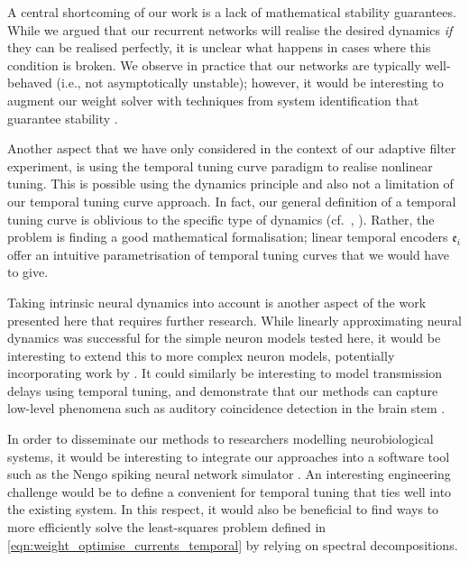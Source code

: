 A central shortcoming of our work is a lack of mathematical stability guarantees.
While we argued that our recurrent networks will realise the desired dynamics \emph{if} they can be realised perfectly, it is unclear what happens in cases where this condition is broken.
We observe in practice that our networks are typically well-behaved (i.e., not asymptotically unstable); however, it would be interesting to augment our weight solver with techniques from system identification that guarantee stability \citep[cf.][]{verhaegen2007filtering}.

Another aspect that we have only considered in the context of our adaptive filter experiment, is using the temporal tuning curve paradigm to realise nonlinear tuning.
This is possible using the \NEF dynamics principle \citep[Chapter~8]{eliasmith2003neural} and also not a limitation of our temporal tuning curve approach.
In fact, our general definition of a temporal tuning curve is oblivious to the specific type of dynamics (cf.~, ).
Rather, the problem is finding a good mathematical formalisation; linear temporal encoders $\mathfrak{e}_i$ offer an intuitive parametrisation of temporal tuning curves that we would have to give.

Taking intrinsic neural dynamics into account is another aspect of the work presented here that requires further research.
While linearly approximating neural dynamics was successful for the simple neuron models tested here, it would be interesting to extend this to more complex neuron models, potentially incorporating work by \citet{duggins2017incorporating}.
It could similarly be interesting to model transmission delays using temporal tuning, and demonstrate that our methods can capture low-level phenomena such as auditory coincidence detection in the brain stem \citep[Chapter~31]{kandel2012principles}.

In order to disseminate our methods to researchers modelling neurobiological systems, it would be interesting to integrate our approaches into a software tool such as the Nengo spiking neural network simulator \citep{bekolay2014nengo}.
An interesting engineering challenge would be to define a convenient \API for temporal tuning that ties well into the existing system.
In this respect, it would also be beneficial to find ways to more efficiently solve the least-squares problem defined in \cref{eqn:weight_optimise_currents_temporal} by relying on spectral decompositions.
